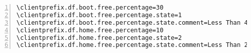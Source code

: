 \documentclass[10pt]{article}
\begin{document}
\begin{Verbatim}[numbers=left,commandchars=\\\{\},numbersep=6pt,fontsize=\small]
\clientprefix.df.boot.free.percentage=30
\clientprefix.df.boot.free.percentage.state=1
\clientprefix.df.boot.free.percentage.state.comment=Less Than 40% Free!
\clientprefix.df.home.free.percentage=10
\clientprefix.df.home.free.percentage.state=2
\clientprefix.df.home.free.percentage.state.comment=Less Than 20% Free!

\end{Verbatim}
\end{document}
